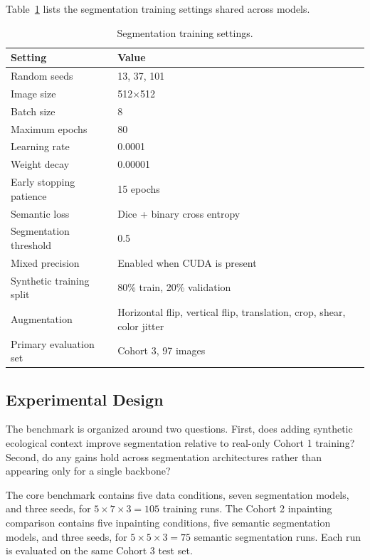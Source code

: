 \documentclass{article}
\begin{document}
Table~\ref{tab:appendix-training-settings} lists the segmentation training settings shared across models.

\begin{table}[H]
  \centering
  \caption{Segmentation training settings.}
  \label{tab:appendix-training-settings}
  \begin{tabular}{ll}
    \toprule
    \textbf{Setting} & \textbf{Value} \\
    \midrule
    Random seeds & 13, 37, 101 \\
    Image size & 512$\times$512 \\
    Batch size & 8 \\
    Maximum epochs & 80 \\
    Learning rate & 0.0001 \\
    Weight decay & 0.00001 \\
    Early stopping patience & 15 epochs \\
    Semantic loss & Dice + binary cross entropy \\
    Segmentation threshold & 0.5 \\
    Mixed precision & Enabled when CUDA is present \\
    Synthetic training split & 80\% train, 20\% validation \\
    Augmentation & Horizontal flip, vertical flip, translation, crop, shear, color jitter \\
    Primary evaluation set & Cohort 3, 97 images \\
    \bottomrule
  \end{tabular}
\end{table}

\subsection{Experimental Design}

The benchmark is organized around two questions. First, does adding synthetic ecological context improve segmentation relative to real-only Cohort 1 training? Second, do any gains hold across segmentation architectures rather than appearing only for a single backbone?

The core benchmark contains five data conditions, seven segmentation models, and three seeds, for \(5 \times 7 \times 3 = 105\) training runs. The Cohort 2 inpainting comparison contains five inpainting conditions, five semantic segmentation models, and three seeds, for \(5 \times 5 \times 3 = 75\) semantic segmentation runs. Each run is evaluated on the same Cohort 3 test set.
\end{document}
